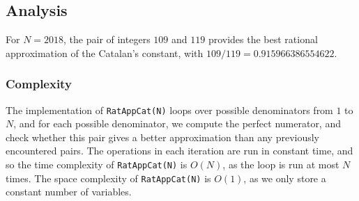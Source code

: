 \subsection{Analysis}

\begin{example}
	For $N = 2018$, the pair of integers $109$ and $119$ provides the best rational approximation of the Catalan's constant, with $109/119 = 0.915966386554622$.
\end{example}

\subsubsection{Complexity}
The implementation of \lstinline|RatAppCat(N)| loops over possible denominators from $1$ to $N$, and for each possible denominator, we compute the perfect numerator, and check whether this pair gives a better approximation than any previously encountered pairs. The operations in each iteration are run in constant time, and so the time complexity of \lstinline|RatAppCat(N)| is $O(N)$, as the loop is run at most $N$ times. The space complexity of \lstinline|RatAppCat(N)| is $O(1)$, as we only store a constant number of variables.
















